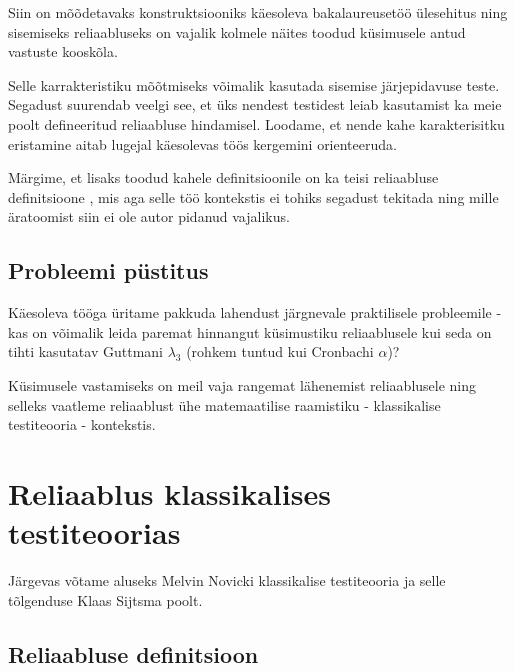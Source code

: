 \documentclass[a4paper,12pt,oneside]{article}
\numberwithin{equation}{section}
\theoremstyle{definition}
\begin{document}
Siin on mõõdetavaks konstruktsiooniks käesoleva bakalaureusetöö \"ulesehitus ning sisemiseks reliaabluseks on vajalik kolmele näites toodud k\"usimusele antud vastuste kooskõla.

Selle karrakteristiku mõõtmiseks võimalik kasutada sisemise järjepidavuse teste. Segadust suurendab veelgi see, et üks nendest testidest leiab kasutamist ka meie poolt defineeritud reliaabluse hindamisel. Loodame, et nende kahe karakterisitku eristamine aitab lugejal käesolevas töös kergemini orienteeruda.

Märgime, et lisaks toodud kahele definitsioonile on ka teisi reliaabluse definitsioone \cite{Cronbach1947}, mis aga selle töö kontekstis ei tohiks segadust tekitada ning  mille äratoomist siin ei ole autor pidanud vajalikus.


\subsection{Probleemi püstitus}

Käesoleva tööga üritame pakkuda lahendust järgnevale praktilisele probleemile - kas on võimalik leida paremat hinnangut küsimustiku reliaablusele kui seda on tihti kasutatav Guttmani $\lambda_3$ (rohkem tuntud kui Cronbachi $\alpha$)?  
 
Küsimusele vastamiseks on meil vaja  rangemat lähenemist reliaablusele ning selleks vaatleme reliaablust ühe matemaatilise raamistiku - klassikalise testiteooria - kontekstis.


\pagebreak


\section{Reliaablus klassikalises testiteoorias}
Järgevas võtame aluseks Melvin Novicki klassikalise testiteooria \cite{Novick1966a}\cite{Lord1968} ja selle tõlgenduse Klaas Sijtsma poolt. \cite[109]{Sijtsma2009}

\subsection{Reliaabluse definitsioon}
\end{document}
